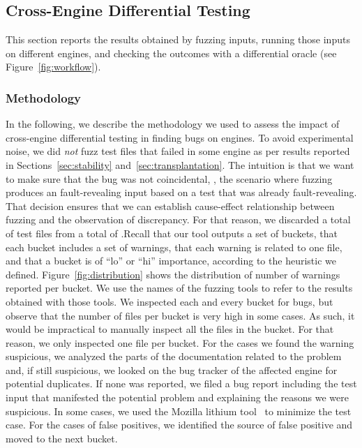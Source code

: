 \documentclass[10pt,conference,anonymous]{IEEEtran}
\begin{document}
\subsection{Cross-Engine Differential Testing}
\label{sec:cross-engine-diff-testing-results}

This section reports the results obtained by fuzzing inputs, running
those inputs on different engines, and checking the outcomes with a
differential oracle (see Figure~\ref{fig:workflow}). 

\subsubsection{Methodology}
In the following, we describe the methodology we used to assess the
impact of cross-engine differential testing in finding bugs on \js{}
engines. To avoid experimental noise, we did \emph{not} fuzz test
files that failed in some engine as per results reported in
Sections~\ref{sec:stability} and~\ref{sec:transplantation}. The
intuition is that we want to make sure that the bug was not
coincidental, \ie{}, the scenario where fuzzing produces an
fault-revealing input based on a test that was already
fault-revealing. That decision ensures that we can establish
cause-effect relationship between fuzzing and the observation of
discrepancy. For that reason, we discarded a total of  test
files from a total of \totalTestFiles{}.Recall that our tool outputs a
set of buckets, that each bucket includes a set of warnings, that each
warning is related to one file, and that a bucket is of ``lo'' or
``hi'' importance, according to the heuristic we
defined. Figure~\ref{fig:distribution} shows the distribution of
number of warnings reported per bucket. We use the names of the
fuzzing tools to refer to the results obtained with those tools. We
inspected each and every bucket for bugs, but observe that the number
of files per bucket is very high in some cases. As such, it would be
impractical to manually inspect all the files in the bucket. For that
reason, we only inspected one file per bucket. For the cases we found
the warning suspicious, we analyzed the parts of the documentation
related to the problem and, if still suspicious, we looked on the bug
tracker of the affected engine for potential duplicates. If none was
reported, we filed a bug report including the test input that
manifested the potential problem and explaining the reasons we were
suspicious. In some cases, we used the Mozilla lithium
tool~\cite{lithium} to minimize the test case. For the cases of false
positives, we identified the source of false positive and moved to the
next bucket.
\end{document}

